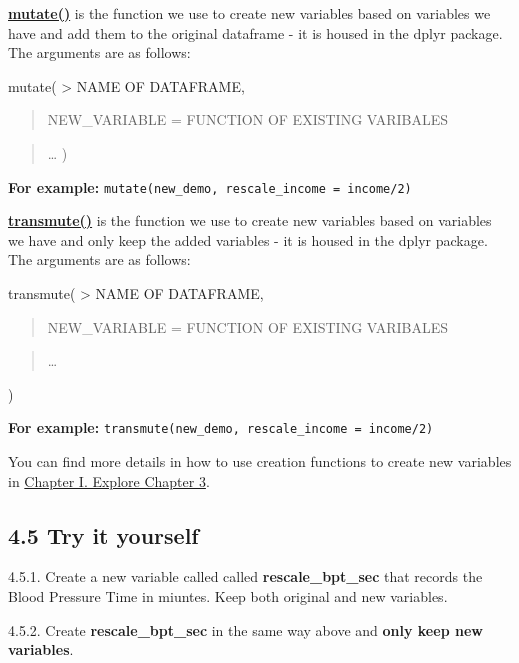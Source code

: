 \documentclass[
]{book}
\begin{document}
\href{https://www.rdocumentation.org/packages/dplyr/versions/0.7.8/topics/mutate}{\textbf{mutate()}} is the function we use to create new variables based on variables we have and add them to the original dataframe - it is housed in the dplyr package. The arguments are as follows:

mutate(
\textgreater{} NAME OF DATAFRAME,

\begin{quote}
NEW\_VARIABLE = FUNCTION OF EXISTING VARIBALES
\end{quote}

\begin{quote}
\ldots{}
)
\end{quote}

\textbf{For example:} \texttt{mutate(new\_demo,\ rescale\_income\ =\ income/2)}

\href{https://www.rdocumentation.org/packages/dplyr/versions/0.7.8/topics/mutate}{\textbf{transmute()}} is the function we use to create new variables based on variables we have and only keep the added variables - it is housed in the dplyr package. The arguments are as follows:

transmute(
\textgreater{} NAME OF DATAFRAME,

\begin{quote}
NEW\_VARIABLE = FUNCTION OF EXISTING VARIBALES
\end{quote}

\begin{quote}
\ldots{}
\end{quote}

)

\textbf{For example:} \texttt{transmute(new\_demo,\ rescale\_income\ =\ income/2)}

You can find more details in how to use creation functions to create new variables in \href{https://learning.oreilly.com/library/view/r-for-data/9781491910382/ch03.html\#transform}{Chapter I. Explore Chapter 3}.

\hypertarget{try-it-yourself-18}{%
\subsection{4.5 Try it yourself}\label{try-it-yourself-18}}

4.5.1. Create a new variable called called \textbf{rescale\_bpt\_sec} that records the Blood Pressure Time in miuntes. Keep both original and new variables.

4.5.2. Create \textbf{rescale\_bpt\_sec} in the same way above and \textbf{only keep new variables}.
\end{document}
